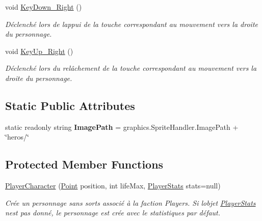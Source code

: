 \begin{DoxyCompactItemize}
void \hyperlink{class_tentacle_slicers_1_1actors_1_1_player_character_a8d5e8af51bb564b68ce9fd13916bb929}{Key\+Down\+\_\+\+Right} ()
\begin{DoxyCompactList}\small\item\em Déclenché lors de l\textquotesingle{}appui de la touche correspondant au mouvement vers la droite du personnage. \end{DoxyCompactList}\item 
void \hyperlink{class_tentacle_slicers_1_1actors_1_1_player_character_a8423a25a3ff0fcd6e9f883c4375fe627}{Key\+Up\+\_\+\+Right} ()
\begin{DoxyCompactList}\small\item\em Déclenché lors du relâchement de la touche correspondant au mouvement vers la droite du personnage. \end{DoxyCompactList}\end{DoxyCompactItemize}
\subsection*{Static Public Attributes}
\begin{DoxyCompactItemize}
\item 
\mbox{\label{class_tentacle_slicers_1_1actors_1_1_player_character_aa021c21aa48a8e90e56a5f92989f6a3b}} 
static readonly string {\bfseries Image\+Path} = graphics.\+Sprite\+Handler.\+Image\+Path + \char`\"{}heros/\char`\"{}
\end{DoxyCompactItemize}
\subsection*{Protected Member Functions}
\begin{DoxyCompactItemize}
\item 
\hyperlink{class_tentacle_slicers_1_1actors_1_1_player_character_a346e53738dbc763ad793e29635872823}{Player\+Character} (\hyperlink{class_tentacle_slicers_1_1general_1_1_point}{Point} position, int life\+Max, \hyperlink{class_tentacle_slicers_1_1actors_1_1_player_stats}{Player\+Stats} stats=null)
\begin{DoxyCompactList}\small\item\em Crée un personnage sans sorts associé à la faction Players. Si l\textquotesingle{}objet \hyperlink{class_tentacle_slicers_1_1actors_1_1_player_stats}{Player\+Stats} n\textquotesingle{}est pas donné, le personnage est crée avec le statistiques par défaut. \end{DoxyCompactList}\end{DoxyCompactItemize}
